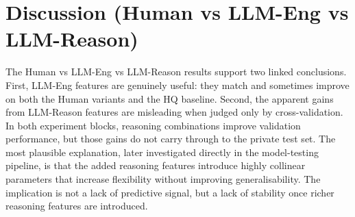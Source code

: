 \documentclass{article}
\theoremstyle{plain}
\theoremstyle{definition}
\theoremstyle{remark}
\begin{document}
\begin{table}[t]
\centering
{}

\vspace{0.5em}

\caption{Validation vs private-test for HQ benchmark with reasoning combinations.}
\label{tab:paper-hq}
\end{table}

\section{Discussion (Human vs LLM-Eng vs LLM-Reason)}
The Human vs LLM-Eng vs LLM-Reason results support two linked conclusions. First, LLM-Eng features are genuinely useful: they match and sometimes improve on both the Human variants and the HQ baseline. Second, the apparent gains from LLM-Reason features are misleading when judged only by cross-validation. In both experiment blocks, reasoning combinations improve validation performance, but those gains do not carry through to the private test set. The most plausible explanation, later investigated directly in the model-testing pipeline, is that the added reasoning features introduce highly collinear parameters that increase flexibility without improving generalisability. The implication is not a lack of predictive signal, but a lack of stability once richer reasoning features are introduced.
\end{document}
